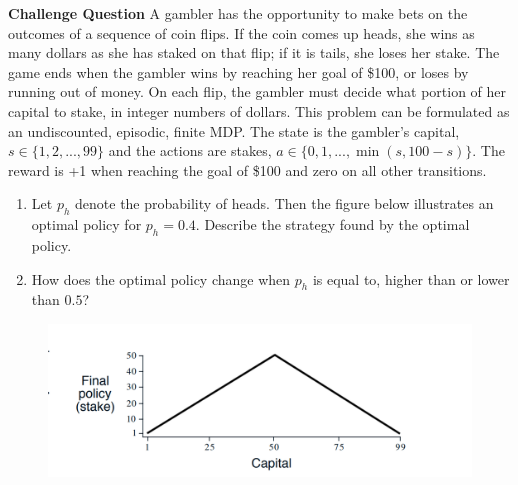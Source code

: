 \textbf{Challenge Question} A gambler has the opportunity to make bets on
the outcomes of a sequence of coin flips. If the coin comes up heads, she wins as many
dollars as she has staked on that flip; if it is tails, she loses her stake. The game ends
when the gambler wins by reaching her goal of \$100, or loses by running out of money.
On each flip, the gambler must decide what portion of her capital to stake, in integer
numbers of dollars. This problem can be formulated as an undiscounted, episodic, finite
MDP. The state is the gambler's capital, $s \in \{1, 2,..., 99\}$ and the actions
are stakes, $a \in \{0, 1,..., \min(s, 100-s) \}$.
The reward is +1 when reaching the goal of \$100 and zero on all other transitions.

\begin{enumerate}
  \item Let $p_{h}$ denote the probability of heads. Then the figure below illustrates an optimal policy for $p_{h} = 0.4$.
    Describe the strategy found by the optimal policy.
  \item How does the optimal policy change when $p_{h}$ is equal to, higher than or lower than $0.5$?
\end{enumerate}

\begin{figure}[h!]
  \center
\includegraphics[width=0.9\linewidth]{figures/figure_4dot3_mod.png}
\end{figure}
\bigspace